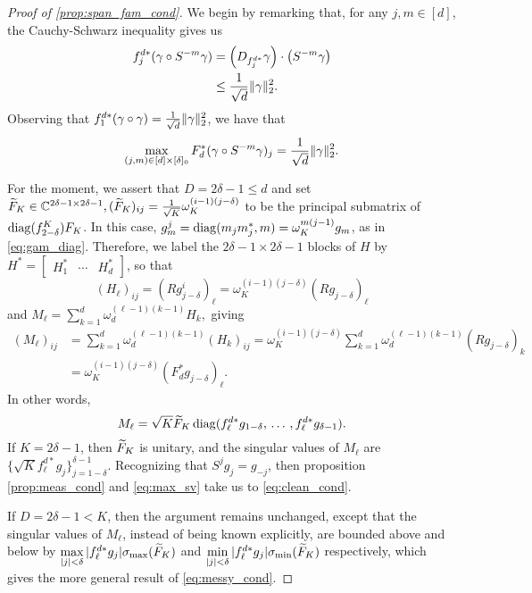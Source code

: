 \begin{proof}[Proof of \cref{prop:span_fam_cond}]
  We begin by remarking that, for any $j, m \in [d]$, the Cauchy-Schwarz inequality gives us
  \begin{align*}
    f_j^{d*} (\gamma \circ S^{-m} \gamma) &= \left(D_{f_j^{d*}} \gamma\right) \cdot \left(S^{-m} \gamma\right) \\
    &\le \frac{1}{\sqrt{d}} \lVert\gamma\rVert_2^2.
  \end{align*}
  Observing that $f_1^{d*}(\gamma \circ \gamma) = \frac{1}{\sqrt{d}} \lVert\gamma\rVert_2^2$, we have that \begin{equation} \max_{(j, m) \in [d] \times [\delta]_0} F_d^* (\gamma \circ S^{-m} \gamma)_j = \frac{1}{\sqrt{d}} \lVert\gamma\rVert_2^2. \label{eq:max_sv} \end{equation}

  For the moment, we assert that $D = 2 \delta - 1 \le d$ and set $\widetilde{F}_K \in \mathbb{C}^{2 \delta - 1 \times 2 \delta - 1}, (\widetilde{F}_K)_{ij} = \frac{1}{\sqrt{K}}\omega_K^{(i-1)(j-\delta)}$ to be the principal submatrix of $\operatorname{diag}(f^K_{2 - \delta}) F_K$.  In this case, $g_m^j = \operatorname{diag}(m_j m_j^*, m) = \omega_K^{m(j - 1)} g_m$, as in \eqref{eq:gam_diag}.  Therefore, we label the $2 \delta - 1 \times 2 \delta - 1$ blocks of $H$ by $H^* = \begin{bmatrix} H_1^* & \cdots & H_d^* \end{bmatrix}$, so that \[(H_\ell)_{ij} = (R g_{j - \delta}^i)_\ell = \omega_K^{(i - 1)(j - \delta)}(R g_{j - \delta})_\ell\] and $M_\ell = \sum_{k = 1}^d \omega_d^{(\ell - 1)(k - 1)} H_k,$ giving \begin{align*} (M_\ell)_{ij} &= \sum_{k = 1}^d \omega_d^{(\ell - 1)(k - 1)} (H_k)_{ij} = \omega_K^{(i - 1)(j - \delta)} \sum_{k = 1}^d \omega_d^{(\ell - 1)(k - 1)} (Rg_{j - \delta})_k \\ &= \omega_K^{(i - 1)(j - \delta)} (F_d^* g_{j - \delta})_\ell. \end{align*}  In other words, \begin{equation} M_\ell = \sqrt{K} \widetilde{F}_K \operatorname{diag}(f_\ell^{d*} g_{1 - \delta},\, \ldots\, , f_\ell^{d*} g_{\delta - 1}). \label{eq:block_diag_components} \end{equation}  If $K = 2 \delta - 1$, then $\widetilde{F}_K$ is unitary, and the singular values of $M_\ell$ are $\{\sqrt{K} f_\ell^{d *} g_j\}_{j = 1 - \delta}^{\delta - 1}$.  Recognizing that $S^j g_j = g_{-j}$, then proposition \ref{prop:meas_cond} and \eqref{eq:max_sv} take us to \eqref{eq:clean_cond}.

  If $D = 2 \delta - 1 < K$, then the argument remains unchanged, except that the singular values of $M_\ell$, instead of being known explicitly, are bounded above and below by $\max\limits_{|j| < \delta} |f_\ell^{d *} g_j| \sigma_{\max}(\widetilde{F}_K)$ and $\min\limits_{|j| < \delta} |f_\ell^{d *} g_j| \sigma_{\min}(\widetilde{F}_K)$ respectively, which gives the more general result of \eqref{eq:messy_cond}.


\end{proof}

